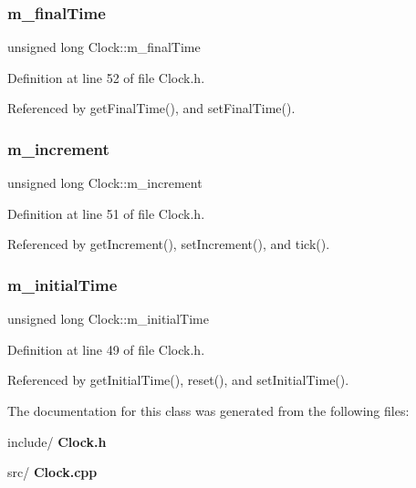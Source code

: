 \mbox{\label{class_clock_a5c473d84c1051d946ab5565060902840}} 
\subsubsection{m\_finalTime}
{\footnotesize\ttfamily unsigned long Clock\+::m\+\_\+final\+Time\hspace{0.3cm}{\ttfamily [private]}}



Definition at line 52 of file Clock.\+h.



Referenced by get\+Final\+Time(), and set\+Final\+Time().

\mbox{\label{class_clock_a2f940f0a30d58d1f7f36d0296463b9aa}} 
\subsubsection{m\_increment}
{\footnotesize\ttfamily unsigned long Clock\+::m\+\_\+increment\hspace{0.3cm}{\ttfamily [private]}}



Definition at line 51 of file Clock.\+h.



Referenced by get\+Increment(), set\+Increment(), and tick().

\mbox{\label{class_clock_a71afbea0f41f612e36d45ee2bb79ff0e}} 
\subsubsection{m\_initialTime}
{\footnotesize\ttfamily unsigned long Clock\+::m\+\_\+initial\+Time\hspace{0.3cm}{\ttfamily [private]}}



Definition at line 49 of file Clock.\+h.



Referenced by get\+Initial\+Time(), reset(), and set\+Initial\+Time().



The documentation for this class was generated from the following files\+:\begin{DoxyCompactItemize}
\item 
include/\textbf{ Clock.\+h}\item 
src/\textbf{ Clock.\+cpp}\end{DoxyCompactItemize}
